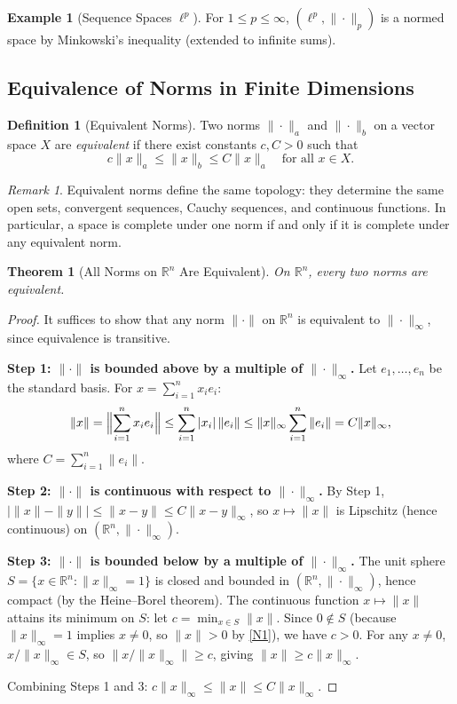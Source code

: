 \documentclass[11pt,a4paper]{article}
\theoremstyle{definition}
\newtheorem{definition}{Definition}[section]
\newtheorem{example}{Example}[section]
\theoremstyle{plain}
\newtheorem{theorem}{Theorem}[section]
\theoremstyle{remark}
\newtheorem{remark}{Remark}[section]
\newcommand{\R}{\mathbb{R}}
\begin{document}
\begin{example}[Sequence Spaces $\ell^p$]
\label{ex:ell_p_norm}
For $1 \le p \le \infty$, $(\ell^p, \|\cdot\|_p)$ is a normed space by
Minkowski's inequality (extended to infinite sums).
\end{example}

\subsection{Equivalence of Norms in Finite Dimensions}
\label{subsec:norm_equiv}

\begin{definition}[Equivalent Norms]
\label{def:norm_equiv}
Two norms $\|\cdot\|_a$ and $\|\cdot\|_b$ on a vector space $X$ are
\emph{equivalent} if there exist constants $c, C > 0$ such that
\[
c \|x\|_a \le \|x\|_b \le C \|x\|_a \quad \text{for all } x \in X.
\]
\end{definition}

\begin{remark}
Equivalent norms define the same topology: they determine the same open sets,
convergent sequences, Cauchy sequences, and continuous functions. In particular,
a space is complete under one norm if and only if it is complete under any
equivalent norm.
\end{remark}

\begin{theorem}[All Norms on $\R^n$ Are Equivalent]
\label{thm:norm_equiv}
On $\R^n$, every two norms are equivalent.
\end{theorem}

\begin{proof}
It suffices to show that any norm $\|\cdot\|$ on $\R^n$ is equivalent to
$\|\cdot\|_\infty$, since equivalence is transitive.

\textbf{Step 1: $\|\cdot\|$ is bounded above by a multiple of $\|\cdot\|_\infty$.}
Let $e_1, \ldots, e_n$ be the standard basis. For $x = \sum_{i=1}^n x_i e_i$:
\[
\|x\| = \Bigl\|\sum_{i=1}^n x_i e_i\Bigr\| \le \sum_{i=1}^n |x_i| \, \|e_i\|
\le \|x\|_\infty \sum_{i=1}^n \|e_i\| = C \|x\|_\infty,
\]
where $C = \sum_{i=1}^n \|e_i\|$.

\textbf{Step 2: $\|\cdot\|$ is continuous with respect to $\|\cdot\|_\infty$.}
By Step 1, $|\|x\| - \|y\|| \le \|x - y\| \le C \|x - y\|_\infty$, so
$x \mapsto \|x\|$ is Lipschitz (hence continuous) on $(\R^n, \|\cdot\|_\infty)$.

\textbf{Step 3: $\|\cdot\|$ is bounded below by a multiple of $\|\cdot\|_\infty$.}
The unit sphere $S = \{x \in \R^n : \|x\|_\infty = 1\}$ is closed and bounded in
$(\R^n, \|\cdot\|_\infty)$, hence compact (by the Heine--Borel theorem). The
continuous function $x \mapsto \|x\|$ attains its minimum on $S$: let
$c = \min_{x \in S} \|x\|$. Since $0 \notin S$ (because $\|x\|_\infty = 1$ implies
$x \ne 0$, so $\|x\| > 0$ by \ref{N1}), we have $c > 0$. For any $x \ne 0$,
$x/\|x\|_\infty \in S$, so $\|x/\|x\|_\infty\| \ge c$, giving
$\|x\| \ge c \|x\|_\infty$.

Combining Steps 1 and 3: $c \|x\|_\infty \le \|x\| \le C \|x\|_\infty$.
\end{proof}
\end{document}
